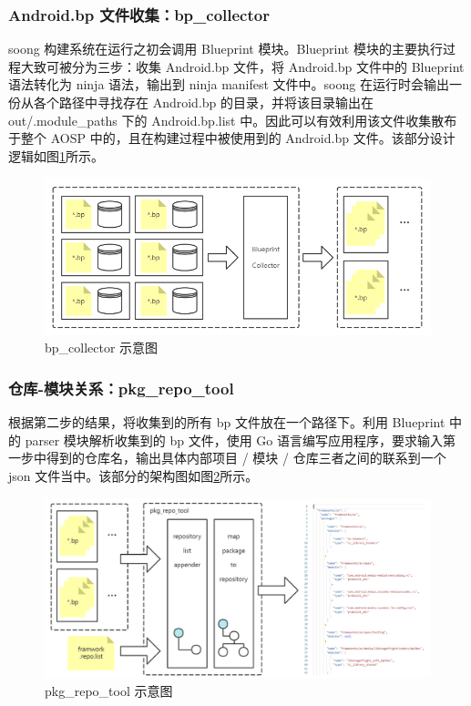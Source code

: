 \subsubsection{Android.bp 文件收集：bp\_collector}

soong 构建系统在运行之初会调用 Blueprint 模块。Blueprint 模块的主要执行过程大致可被分为三步：收集 Android.bp 文件，将 Android.bp 文件中的 Blueprint 语法转化为 ninja 语法，输出到 ninja manifest 文件中。soong 在运行时会输出一份从各个路径中寻找存在 Android.bp 的目录，并将该目录输出在 out/.module\_paths 下的 Android.bp.list 中。因此可以有效利用该文件收集散布于整个 AOSP 中的，且在构建过程中被使用到的 Android.bp 文件。该部分设计逻辑如图\ref{fig:archi-bp-collector}所示。

\begin{figure}
    \centering
    \includegraphics[width=.8\textwidth]{figures/archi-bp-collector.png}
    \caption{bp\_collector 示意图}
    \label{fig:archi-bp-collector}
\end{figure}

\subsubsection{仓库-模块关系：pkg\_repo\_tool}

根据第二步的结果，将收集到的所有 bp 文件放在一个路径下。利用 Blueprint 中的 parser 模块解析收集到的 bp 文件，使用 Go 语言编写应用程序，要求输入第一步中得到的仓库名，输出具体内部项目 / 模块 / 仓库三者之间的联系到一个 json 文件当中。该部分的架构图如图\ref{fig:archi-pkg-repo-tool}所示。

\begin{figure}
    \centering
    \includegraphics[width=.8\textwidth]{figures/archi-pkg-repo-tool.png}
    \caption{pkg\_repo\_tool 示意图}
    \label{fig:archi-pkg-repo-tool}
\end{figure}

